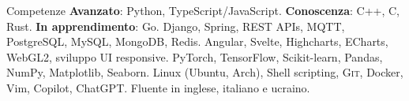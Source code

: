 

\begin{rubric}{Competenze}
	\small{\textbf{Avanzato}: Python, TypeScript/JavaScript. \textbf{Conoscenza}: C++, C, Rust. \textbf{In apprendimento}: Go.}
	\small {Django, Spring, REST APIs, MQTT, PostgreSQL, MySQL, MongoDB, Redis.}
%
	\small{Angular, Svelte, Highcharts, ECharts, WebGL2, sviluppo UI responsive.}
%
\entry*[\textbf{ML/DS}]
	\small{PyTorch, TensorFlow, Scikit-learn, Pandas, NumPy, Matplotlib, Seaborn.}
%
	\small{Linux (Ubuntu, Arch), Shell scripting, \textsc{Git}, Docker, Vim, Copilot, ChatGPT.}
%
	\small {Fluente in inglese, italiano e ucraino.}
\end{rubric}
